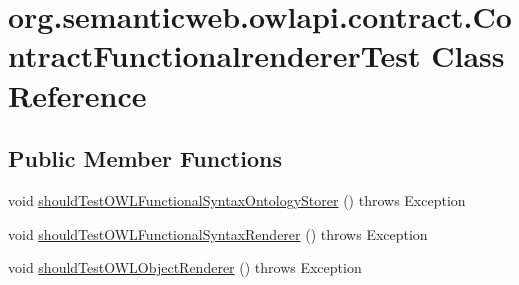 \hypertarget{classorg_1_1semanticweb_1_1owlapi_1_1contract_1_1_contract_functionalrenderer_test}{\section{org.\-semanticweb.\-owlapi.\-contract.\-Contract\-Functionalrenderer\-Test Class Reference}
\label{classorg_1_1semanticweb_1_1owlapi_1_1contract_1_1_contract_functionalrenderer_test}
}
\subsection*{Public Member Functions}
\begin{DoxyCompactItemize}
\item 
void \hyperlink{classorg_1_1semanticweb_1_1owlapi_1_1contract_1_1_contract_functionalrenderer_test_a6dc043b25c103e295c992d7e2341b774}{should\-Test\-O\-W\-L\-Functional\-Syntax\-Ontology\-Storer} ()  throws Exception 
\item 
void \hyperlink{classorg_1_1semanticweb_1_1owlapi_1_1contract_1_1_contract_functionalrenderer_test_a58ec73226b99c9f0f3b5876a0773607b}{should\-Test\-O\-W\-L\-Functional\-Syntax\-Renderer} ()  throws Exception 
\item 
void \hyperlink{classorg_1_1semanticweb_1_1owlapi_1_1contract_1_1_contract_functionalrenderer_test_a47ab22b63d8401e8005a26d02dbd15d5}{should\-Test\-O\-W\-L\-Object\-Renderer} ()  throws Exception 
\end{DoxyCompactItemize}


